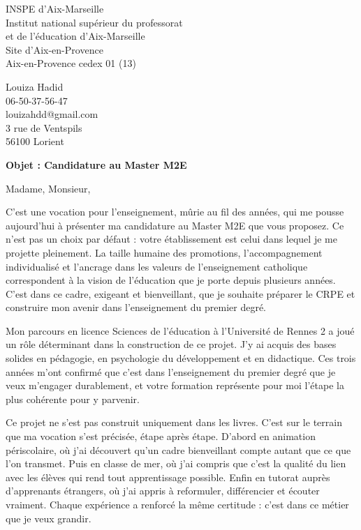\documentclass[12pt,a4paper]{letter}
\begin{document}
\begin{letter}{INSPE d'Aix-Marseille\\
Institut national supérieur du professorat\\
et de l'éducation d'Aix-Marseille\\
Site d'Aix-en-Provence\\
Aix-en-Provence cedex 01 (13)}

\hspace{-2cm}
\begin{minipage}{0.45\textwidth}
Louiza Hadid\\
06-50-37-56-47\\
louizahdd@gmail.com\\
3 rue de Ventspils\\
56100 Lorient
\end{minipage}

\vspace{1cm}

\textbf{Objet : Candidature au Master M2E}

\opening{Madame, Monsieur,}

\hspace{1cm} C'est une vocation pour l'enseignement, mûrie au fil des années, qui me pousse aujourd'hui à présenter ma candidature au Master M2E que vous proposez. Ce n'est pas un choix par défaut : votre établissement est celui dans lequel je me projette pleinement. La taille humaine des promotions, l'accompagnement individualisé et l'ancrage dans les valeurs de l'enseignement catholique correspondent à la vision de l'éducation que je porte depuis plusieurs années. C'est dans ce cadre, exigeant et bienveillant, que je souhaite préparer le CRPE et construire mon avenir dans l'enseignement du premier degré.

\hspace{1cm} Mon parcours en licence Sciences de l'éducation à l'Université de Rennes 2 a joué un rôle déterminant dans la construction de ce projet. J'y ai acquis des bases solides en pédagogie, en psychologie du développement et en didactique. Ces trois années m'ont confirmé que c'est dans l'enseignement du premier degré que je veux m'engager durablement, et votre formation représente pour moi l'étape la plus cohérente pour y parvenir.

\hspace{1cm} Ce projet ne s'est pas construit uniquement dans les livres. C'est sur le terrain que ma vocation s'est précisée, étape après étape. D'abord en animation périscolaire, où j'ai découvert qu'un cadre bienveillant compte autant que ce que l'on transmet. Puis en classe de mer, où j'ai compris que c'est la qualité du lien avec les élèves qui rend tout apprentissage possible. Enfin en tutorat auprès d'apprenants étrangers, où j'ai appris à reformuler, différencier et écouter vraiment. Chaque expérience a renforcé la même certitude : c'est dans ce métier que je veux grandir.


\end{letter}
\end{document}
